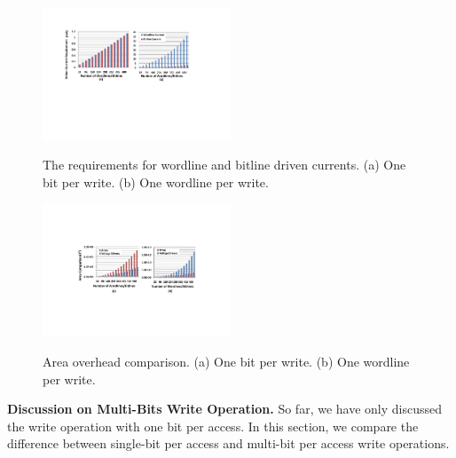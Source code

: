 \begin{figure}%
\centering
  \includegraphics[width=0.5\textwidth]{./figures/drive_i_f.pdf}\\
  \caption{The requirements for wordline and bitline driven currents. (a) One bit per write. (b) One wordline per write.}\label{fig:drive_i}
\end{figure}



\begin{figure}%
\centering
  \includegraphics[width=0.5\textwidth]{./figures/area_comp_f1.pdf}\\
  \caption{Area overhead comparison. (a) One bit per write. (b) One wordline per write.}\label{fig:area_i}
\vspace{-10pt}
\end{figure}

\vspace{5pt}\noindent\textbf{Discussion on Multi-Bits Write Operation.} %
%
So far, we have only discussed the write operation with one bit per
access. In this section, we compare the difference between single-bit per
access and multi-bit per access write operations.

